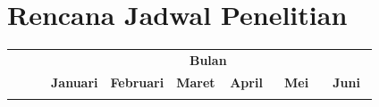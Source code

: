 \documentclass[oneside,listof=totoc]{scrbook}
\begin{document}
\clearpage
\begin{table}
\vspace{0.3cm}
\section{Rencana Jadwal Penelitian}

\hspace{-1.5cm}\noindent\begin{minipage}{\textwidth}
  \label{tabel:3.1}
  \normalfont
  \setlength\extrarowheight{2pt}
  \vspace{0.3cm}
  \begin{longtable}{|l|p{3.0cm}|p{4.5cm}|l|l|l|l|l|l|l|l|l|l|l|l|l|l|l|l|l|l|l|l|l|l|l|l|}
  \hline
  \rowcolor[HTML]{DEEAF6}
  \multicolumn{1}{|c|}{\cellcolor[HTML]{DEEAF6}} & \multicolumn{1}{c|}{\cellcolor[HTML]{DEEAF6}} & \multicolumn{1}{c|}{\cellcolor[HTML]{DEEAF6}} & \multicolumn{24}{c|}{\cellcolor[HTML]{DEEAF6}\textbf{Bulan}} \\ \cline{4-27}
  \rowcolor[HTML]{DEEAF6}
  \multicolumn{1}{|c|}{\cellcolor[HTML]{DEEAF6}} & \multicolumn{1}{c|}{\cellcolor[HTML]{DEEAF6}} & \multicolumn{1}{c|}{\cellcolor[HTML]{DEEAF6}} & \multicolumn{4}{c|}{\cellcolor[HTML]{DEEAF6}\textbf{Januari}} & \multicolumn{4}{c|}{\cellcolor[HTML]{DEEAF6}\textbf{Februari}} & \multicolumn{4}{c|}{\cellcolor[HTML]{DEEAF6}\textbf{Maret}} & \multicolumn{4}{c|}{\cellcolor[HTML]{DEEAF6}\textbf{April}} & \multicolumn{4}{c|}{\cellcolor[HTML]{DEEAF6}\textbf{Mei}} & \multicolumn{4}{c|}{\cellcolor[HTML]{DEEAF6}\textbf{Juni}} \\ \cline{4-27}
  \rowcolor[HTML]{DEEAF6}

\end{longtable}
\end{minipage}
\end{table}
\end{document}
